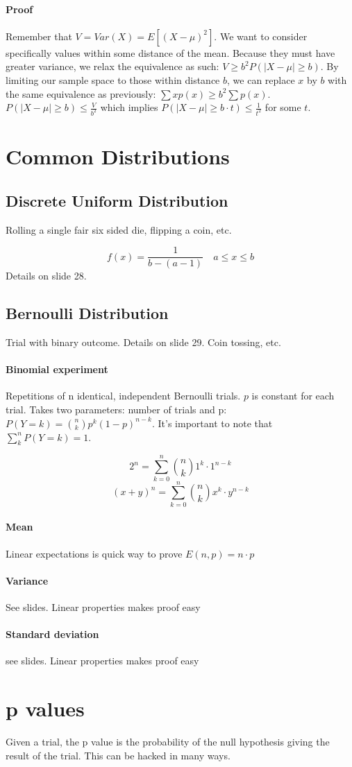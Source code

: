 \documentclass[a4paper]{article}
\begin{document}
\paragraph{Proof}
Remember that $V=Var(X)=E[(X-\mu)^2]$. We want to consider specifically values within some distance of the mean. Because they must have greater variance, we relax the equivalence as such: $V\ge b^2P(|X-\mu|\ge b)$. By limiting our sample space to those within distance $b$, we can replace $x$ by $b$ with the same equivalence as previously: $\sum xp(x) \ge b^2 \sum p(x)$.
$P(|X-\mu|\ge b) \le \frac{V}{b^2}$ which implies
$P(|X-\mu|\ge b\cdot t) \le \frac{1}{t^2}$ for some $t$.

\section{Common Distributions}

\subsection{Discrete Uniform Distribution}
Rolling a single fair six sided die, flipping a coin, etc.

\[f(x)=\frac{1}{b-(a-1)} \quad a \le x \le b\]
Details on slide 28.

\subsection{Bernoulli Distribution}
Trial with binary outcome. Details on slide 29. Coin tossing, etc.

\paragraph{Binomial experiment}
Repetitions of n identical, independent Bernoulli trials. $p$ is constant for each trial. Takes two parameters: number of trials and p: $P(Y=k) = \binom{n}{k}p^k(1-p)^{n-k}$. It's important to note that $\sum\limits^n_kP(Y=k)=1$.

\[2^n=\sum\limits_{k=0}^n\binom{n}{k}1^k\cdot 1^{n-k}\]
\[(x+y)^n=\sum\limits_{k=0}^n\binom{n}{k}x^k\cdot y^{n-k}\]

\paragraph{Mean}
Linear expectations is quick way to prove $E(n,p)=n\cdot p$

\paragraph{Variance}
See slides. Linear properties makes proof easy

\paragraph{Standard deviation}
see slides. Linear properties makes proof easy

\section{p values}
Given a trial, the p value is the probability of the null hypothesis giving the result of the trial. This can be hacked in many ways.
\end{document}
